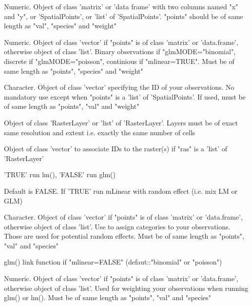 \documentclass[a4paper]{book}
\begin{document}
\begin{Arguments}
\begin{ldescription}
\item[\code{points}] Numeric. Object of class 'matrix' or 'data frame' with two columns named
"x" and "y", or 'SpatialPoints', or 'list' of 'SpatialPoints'. "points" should
be of same length as "val", "species" and "weight"

\item[\code{val}] Numeric. Object of class 'vector' if "points" is of class 'matrix' or 'data.frame',
otherwise object of class 'list'. Binary observations if "glmMODE="binomial",
discrete if "glmMODE="poisson", continious if "mlinear=TRUE". Must be of same
length as "points", "species" and "weight"

\item[\code{species}] Character. Object of class 'vector' specifying the ID of your observations.
No mandatory use except when "points" is a 'list' of 'SpatialPoints'. If used,
must be of same length as "points", "val" and "weight"

\item[\code{ras}] Object of class 'RasterLayer' or 'list' of 'RasterLayer'. Layers must be
of exact same resolution and extent i.e. exactly the same number of cells

\item[\code{rasCLASS}] Object of class 'vector' to associate IDs to the raster(s) if
"ras" is a 'list' of 'RasterLayer'

\item[\code{mlinear}] 'TRUE' run lm(), 'FALSE' run glm()

\item[\code{mixEffect}] Default is FALSE. If 'TRUE' run mLinear with random effect (i.e. mix LM or GLM)

\item[\code{mixCat}] Character. Object of class 'vector' if "points" is of class 'matrix' or 'data.frame',
otherwise object of class 'list'. Use to assign categories to your observations. Those
are used for potential random effects. Must be of same length as "points", "val" and "species"

\item[\code{glmMODE}] glm() link function if "mlinear=FALSE" (defaut::"binomial" or "poisson")

\item[\code{weight}] Numeric. Object of class 'vector' if "points" is of class 'matrix' or 'data.frame',
otherwise object of class 'list'. Used for weighting your observations when running glm()
or lm(). Must be of same length as "points", "val" and "species"


\end{ldescription}
\end{Arguments}
\end{document}
